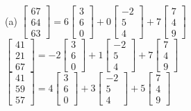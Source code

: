 \documentclass[addpoints]{exam}
\begin{document}
\begin{sloppypar}
\begin{questions}
\begin{solution}
        (a) $ \begin{bmatrix}
            67 \\ 64 \\ 63
        \end{bmatrix} = 6\begin{bmatrix}
            3 \\ 6 \\ 0
        \end{bmatrix} + 0\begin{bmatrix}
            -2 \\ 5 \\ 4
        \end{bmatrix} + 7\begin{bmatrix}
            7 \\ 4 \\ 9
        \end{bmatrix}$ \\ 
        $ \begin{bmatrix}
            41 \\ 21 \\ 67
        \end{bmatrix} = -2\begin{bmatrix}
            3 \\ 6 \\ 0
        \end{bmatrix} + 1\begin{bmatrix}
            -2 \\ 5 \\ 4
        \end{bmatrix} + 7\begin{bmatrix}
            7 \\ 4 \\ 9
        \end{bmatrix}$ \\ 
        $ \begin{bmatrix}
            41 \\ 59 \\ 57
        \end{bmatrix} = 4\begin{bmatrix}
            3 \\ 6 \\ 0
        \end{bmatrix} + 3\begin{bmatrix}
            -2 \\ 5 \\ 4
        \end{bmatrix} + 5\begin{bmatrix}
            7 \\ 4 \\ 9
        \end{bmatrix} $


\end{solution}
\end{questions}
\end{sloppypar}
\end{document}
